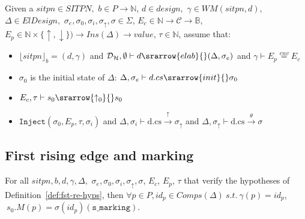 \documentclass[dvipsnames,12pt]{article}
\begin{document}
\begin{definition}
  \label{def:fst-re-hyps}
  Given a $sitpn\in{}SITPN,$ $b\in{}P\rightarrow\mathbb{N}$, $d\in{}design,$
  $\gamma\in{}WM(sitpn,d),$ $\Delta\in{}ElDesign,$
  $\sigma_{e},\sigma_0,\sigma_i,\sigma_{\uparrow},\sigma\in{}\Sigma$,
  $E_c\in{}\mathbb{N}\rightarrow{}\mathcal{C}\rightarrow{}\mathbb{B}$,\\
  $E_p\in\mathbb{N}\times{}\{\uparrow,\downarrow\})\rightarrow{}Ins(\Delta)\rightarrow{}value$,
  $\tau\in\mathbb{N}$, assume that:
  \begin{itemize}
  \item $\lfloor{}sitpn\rfloor_b=(d,\gamma)$ and
    $\mathcal{D}_\mathcal{H},\emptyset\vdash{}d\srarrow{elab}{\fontsize{6}{8}\selectfont}(\Delta,\sigma_{e})$
    and $\gamma\vdash{}E_p\stackrel{env}{=}E_c$
  \item $\sigma_0$ is the initial state of $\Delta$: 
    $\Delta,\sigma_{e}\vdash{}d.cs\srarrow{init}{\fontsize{6}{8}\selectfont}\sigma_0$
  \item $E_c,\tau\vdash{}s_0\srarrow{\uparrow_0}{\fontsize{6}{8}\selectfont}s_0$
  \item $\mathtt{Inject}(\sigma_0, E_p, \tau, \sigma_i)$
    and
    $\Delta,\sigma_i\vdash\mathrm{d.cs}\xrightarrow{\uparrow}\sigma_{\uparrow}$
    and
    $\Delta,\sigma_{\uparrow}\vdash\mathrm{d.cs}\xrightarrow{\theta}\sigma$
  \end{itemize}
  
\end{definition}

\def\fstrehyps{For all $sitpn,b,d,\gamma,\Delta,$
  $\sigma_{e},\sigma_0,\sigma_i,\sigma_{\uparrow},\sigma$, $E_c$,
  $E_p$, $\tau$ that verify the hypotheses of
  Definition~\ref{def:fst-re-hyps},}

\subsection{First rising edge and marking}
\label{sec:fst-re-marking}

\begin{lemma}
  \label{lem:fst-re-equal-marking}
  \fstrehyps{} then
  $\forall{}p\in{}P,id_p\in{}Comps(\Delta)~s.t.~\gamma(p)=id_p$,
  $~s_0.M(p)=\sigma(id_p)(\texttt{s\_marking})$.
\end{lemma}
\end{document}
